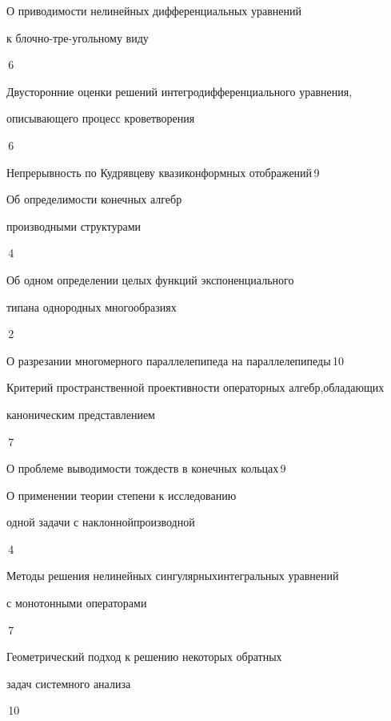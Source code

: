 

{О приводимости нелинейных дифференциальных уравнений


к блочно-тре-\newline угольному виду}{\No\,6}




{Двусторонние оценки решений интегродифференциального уравнения, \newline


описывающего процесс кроветворения}{\No\,6}




{Непрерывность по Кудрявцеву квазиконформных отображений}{\No\,9}




{Об определимости конечных алгебр


производными структурами}{\No\,4}




{Об одном определении целых функций экспоненциального


типа\newline на однородных многообразиях}{\No\,2}




{О разрезании многомерного параллелепипеда на параллелепипеды}{\No\,10}




{Критерий пространственной проективности операторных алгебр,\newline обладающих


каноническим представлением}{\No\,7}




{О проблеме выводимости тождеств в конечных кольцах}{\No\,9}




{О применении теории степени к исследованию


одной задачи с наклонной\newline производной}{\No\,4}




{Методы решения нелинейных сингулярных\newline интегральных уравнений


с монотонными операторами}{\No\,7}




{Геометрический подход к решению некоторых обратных \newline


задач системного анализа}{\No\,10}


